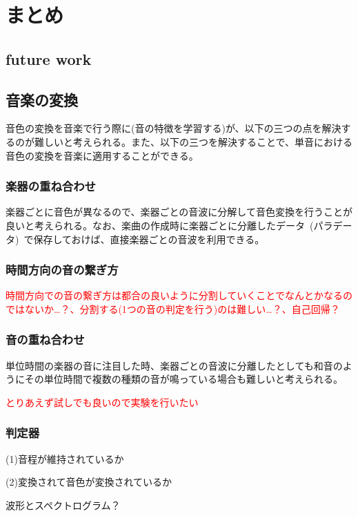 \chapter{まとめ}


\section{future work}



\section{音楽の変換}


音色の変換を音楽で行う際に(音の特徴を学習する)が、以下の三つの点を解決するのが難しいと考えられる。また、以下の三つを解決することで、単音における音色の変換を音楽に適用することができる。

\subsection{楽器の重ね合わせ}

楽器ごとに音色が異なるので、楽器ごとの音波に分解して音色変換を行うことが良いと考えられる。なお、楽曲の作成時に楽器ごとに分離したデータ~(パラデータ)~で保存しておけば、直接楽器ごとの音波を利用できる。


\subsection{時間方向の音の繋ぎ方}

\textcolor{red}{時間方向での音の繋ぎ方は都合の良いように分割していくことでなんとかなるのではないか…？、分割する(1つの音の判定を行う)のは難しい…？、自己回帰？}

\subsection{音の重ね合わせ}

単位時間の楽器の音に注目した時、楽器ごとの音波に分離したとしても和音のようにその単位時間で複数の種類の音が鳴っている場合も難しいと考えられる。

\textcolor{red}{とりあえず試しでも良いので実験を行いたい}



\subsection{判定器}

(1)音程が維持されているか

(2)変換されて音色が変換されているか

波形とスペクトログラム？


